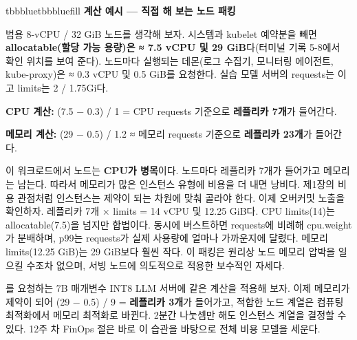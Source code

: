 \begin{calloutbox}{tbbblue}{tbbbluefill}
{\normalsize\bfseries\color{tbbblue}계산 예시 — 직접 해 보는 노드 패킹}\par\vspace{3pt}
범용 8-vCPU / 32 GiB 노드를 생각해 보자. 시스템과 kubelet 예약분을 빼면 \textbf{allocatable(할당 가능 용량)은 ≈ 7.5 vCPU 및 29 GiB}다(터미널 기록 5-8에서 확인 위치를 보여 준다). 노드마다 실행되는 데몬(로그 수집기, 모니터링 에이전트, kube-proxy)은 ≈ 0.3 vCPU 및 0.5 GiB를 요청한다. 실습 모델 서버의 requests는 이고 limits는 2 / 1.75Gi다.

\begin{tbbitemize}
  \item \textbf{CPU 계산:} (7.5 − 0.3) / 1 = CPU requests 기준으로 \textbf{레플리카 7개}가 들어간다.
  \item \textbf{메모리 계산:} (29 − 0.5) / 1.2 ≈ 메모리 requests 기준으로 \textbf{레플리카 23개}가 들어간다.
\end{tbbitemize}

이 워크로드에서 노드는 \textbf{CPU가 병목}이다. 노드마다 레플리카 7개가 들어가고 메모리는 남는다. 따라서 메모리가 많은 인스턴스 유형에 비용을 더 내면 낭비다. 제1장의 비용 관점처럼 인스턴스는 제약이 되는 차원에 맞춰 골라야 한다. 이제 오버커밋 노출을 확인하자. 레플리카 7개 × limits = 14 vCPU 및 12.25 GiB다. CPU limits(14)는 allocatable(7.5)을 넘지만 합법이다. 동시에 버스트하면 requests에 비례해 cpu.weight가 분배하며, p99는 requests가 실제 사용량에 얼마나 가까운지에 달렸다. 메모리 limits(12.25 GiB)는 29 GiB보다 훨씬 작다. 이 패킹은 원리상 노드 메모리 압박을 일으킬 수조차 없으며, 서빙 노드에 의도적으로 적용한 보수적인 자세다.

를 요청하는 7B 매개변수 INT8 LLM 서버에 같은 계산을 적용해 보자. 이제 메모리가 제약이 되어 (29 − 0.5) / 9 = \textbf{레플리카 3개}가 들어가고, 적합한 노드 계열은 컴퓨팅 최적화에서 메모리 최적화로 바뀐다. 2분간 나눗셈만 해도 인스턴스 계열을 결정할 수 있다. 12주 차 FinOps 절은 바로 이 습관을 바탕으로 전체 비용 모델을 세운다.
\end{calloutbox}

\vspace{3.0pt}

